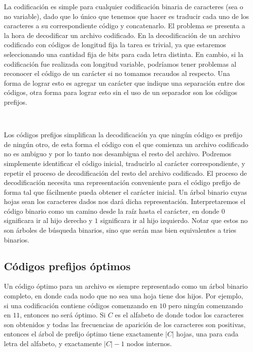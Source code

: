 La codificaci\'on es simple para cualquier codificaci\'on binaria de caracteres (sea o no variable), dado que lo \'unico que tenemos que hacer es traducir cada uno de los caracteres a su correspondiente c\'odigo y concatenarlo. El problema se presenta a la hora de decodificar un archivo codificado. En la decodificaci\'on de un archivo codificado con c\'odigos de longitud fija la tarea es trivial, ya que estaremos seleccionando una cantidad fija de bits para cada letra distinta. En cambio, si la codificaci\'on fue realizada con longitud variable, podr\'iamos tener problemas al reconocer el c\'odigo de un car\'acter si no tomamos recaudos al respecto. Una forma de lograr esto es agregar un car\'acter que indique una separaci\'on entre dos c\'odigos, otra forma para lograr esto sin el uso de un separador son los c\'odigos prefijos.

~

Los c\'odigos prefijos simplifican la decodificaci\'on ya que ning\'un c\'odigo es prefijo de ning\'un otro, de esta forma el c\'odigo con el que comienza un archivo codificado no es ambiguo y por lo tanto nos desambigua el resto del archivo. Podremos simplemente identificar el c\'odigo inicial, traducirlo al car\'acter correspondiente, y repetir el proceso de decodificaci\'on del resto del archivo codificado. El proceso de decodificaci\'on necesita una representaci\'on conveniente para el c\'odigo prefijo de forma tal que f\'acilmente pueda obtener el car\'acter inicial. Un \'arbol binario cuyas hojas sean los caracteres dados nos dar\'a dicha representaci\'on. Interpretaremos el c\'odigo binario como un camino desde la ra\'iz hasta el car\'acter, en donde $0$ significara ir al hijo derecho y $1$ significara ir al hijo izquierdo. Notar que estos no son \'arboles de b\'usqueda binarios, sino que ser\'an mas bien equivalentes a tries binarios.

\subsection{C\'odigos prefijos \'optimos}

Un c\'odigo \'optimo para un archivo es siempre representado como un \'arbol binario completo, en donde cada nodo que no sea una hoja tiene dos hijos. Por ejemplo, si una codificaci\'on contiene c\'odigos comenzando en $10$ pero ning\'un comenzando en $11$, entonces no ser\'a \'optimo. Si $C$ es el alfabeto de donde todos los caracteres son obtenidos y todas las frecuencias de aparici\'on de los caracteres son positivas, entonces el \'arbol de prefijo \'optimo tiene exactamente $|C|$ hojas, una para cada letra del alfabeto, y exactamente $|C|-1$ nodos internos.

